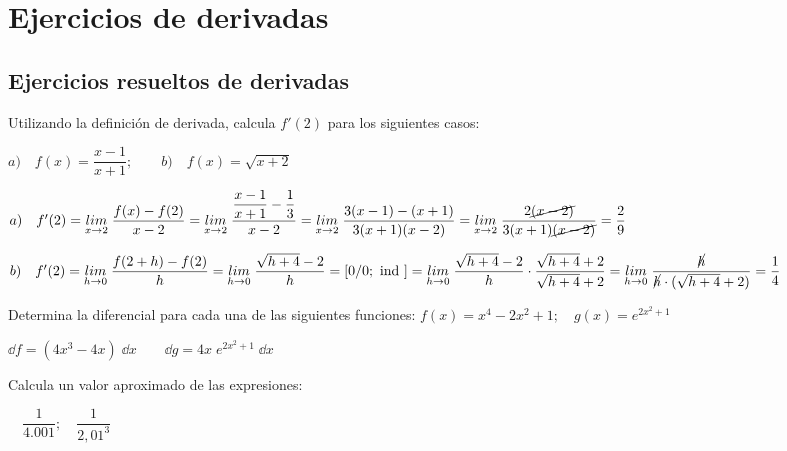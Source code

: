 			\section{Ejercicios de derivadas}
	\subsection{Ejercicios resueltos de derivadas}
	
	\begin{ejre} Utilizando la definición de derivada, calcula $f'(2)$ para los siguientes casos:
	
	$a) \quad f(x)=\dfrac {x-1}{x+1}; \qquad b) \quad f(x)=\sqrt{x+2}$
	\end{ejre}
	
	\begin{proofw}\renewcommand{\qedsymbol}{$\diamond$}
	
	$a) \quad f'(2)=\underset{x\to 2}{lim}\;{\dfrac {f(x)-f(2)}{x-2}}= \underset{x\to 2}{lim}\; {\dfrac {\dfrac {x-1}{x+1}-\dfrac 1 3}{x-2}}=\underset{x\to 2}{lim}\; {\dfrac {3(x-1)-(x+1)}{3(x+1)(x-2)}}=\underset{x\to 2}{lim}\; {\dfrac {2\cancel{(x-2)}}{3(x+1)\cancel{(x-2)}}}=\dfrac 2 9$
	
	$b) \quad f'(2)=\underset{h\to 0}{lim}\;{\dfrac {f(2+h)-f(2)}{h}}=\underset{h\to 0}{lim}\;{\dfrac {\sqrt{h+4}-2}{h}}=[0/0;\mbox{ ind }]= \underset{h\to 0}{lim}\;{\dfrac {\sqrt{h+4}-2}{h}}\cdot \dfrac {\sqrt{h+4}+2}{\sqrt{h+4}+2}=\underset{h\to 0}{lim}\;{\dfrac {\cancel{h}}{\cancel{h}\cdot(\sqrt{h+4}+2) }}=\dfrac 1 4$
	
	\end{proofw}
	
	\begin{ejre} Determina la diferencial para cada una de las siguientes funciones: $f(x)=x^4-2x^2+1;\quad g(x)=e^{2x^2+1}$	
	\end{ejre}
	
	\begin{proofw}\renewcommand{\qedsymbol}{$\diamond$}
	
	$\dd f= (4x^3-4x)\; \dd x \qquad \dd g= 4x\; e^{2x^2+1}\; \dd x$
	\end{proofw}
	
	\begin{ejre} Calcula un valor aproximado de las expresiones: 
	
	$\quad \dfrac 1 {4.001}; \quad \dfrac {1}{2,01^3}$	
	\end{ejre}
	
